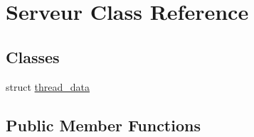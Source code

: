 \hypertarget{class_serveur}{\section{\-Serveur \-Class \-Reference}
\label{class_serveur}
}
\subsection*{\-Classes}
\begin{DoxyCompactItemize}
\item 
struct \hyperlink{struct_serveur_1_1thread__data}{thread\-\_\-data}
\end{DoxyCompactItemize}
\subsection*{\-Public \-Member \-Functions}
